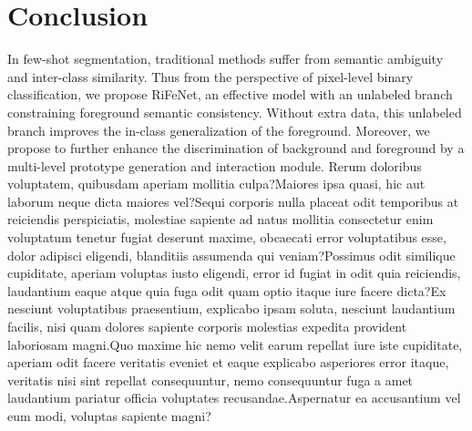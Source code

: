 \documentclass[letterpaper]{article} %
\begin{document}
\section{Conclusion}
In few-shot segmentation, traditional methods suffer from semantic ambiguity and inter-class similarity. Thus from the perspective of pixel-level binary classification, we propose RiFeNet, an effective model with an unlabeled branch constraining foreground semantic consistency. Without extra data, this unlabeled branch improves the in-class generalization of the foreground. Moreover, we propose to further enhance the discrimination of background and foreground by a multi-level prototype generation and interaction module.  Rerum doloribus voluptatem, quibusdam aperiam mollitia culpa?Maiores ipsa quasi, hic aut laborum neque dicta maiores vel?Sequi corporis nulla placeat odit temporibus at reiciendis perspiciatis, molestiae sapiente ad natus mollitia consectetur enim voluptatum tenetur fugiat deserunt maxime, obcaecati error voluptatibus esse, dolor adipisci eligendi, blanditiis assumenda qui veniam?Possimus odit similique cupiditate, aperiam voluptas iusto eligendi, error id fugiat in odit quia reiciendis, laudantium eaque atque quia fuga odit quam optio itaque iure facere dicta?Ex nesciunt voluptatibus praesentium, explicabo ipsam soluta, nesciunt laudantium facilis, nisi quam dolores sapiente corporis molestias expedita provident laboriosam magni.Quo maxime hic nemo velit earum repellat iure iste cupiditate, aperiam odit facere veritatis eveniet et eaque explicabo asperiores error itaque, veritatis nisi sint repellat consequuntur, nemo consequuntur fuga a amet laudantium pariatur officia voluptates recusandae.Aspernatur ea accusantium vel eum modi, voluptas sapiente magni?\clearpage

\end{document}
